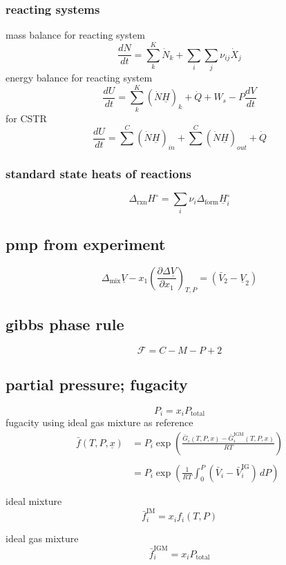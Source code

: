 \documentclass{article}
\begin{document}
\begin{minipage}[t]{0.5\textwidth}
    \subsubsection*{reacting systems}
    mass balance for reacting system
    \[\frac{dN}{dt} = \sum_{k}^K \dot{N}_{k} + \sum_{i} \sum_{j} \nu_{ij} \dot{X}_{j}\]
    energy balance for reacting system
    \[\frac{dU}{dt} = \sum_{k}^K(\dot{N}\underline{H})_{k} + \dot{Q} + W_{s} -P \frac{dV}{dt}\]
    for CSTR
    \[\frac{dU}{dt} = \sum^{C} (\dot{N}\underline{H})_{in} + \sum^{C} (\dot{N}\underline{H})_{out} + \dot{Q} \]
    \subsubsection*{standard state heats of reactions}
    \[\Delta_{\text{rxn}} H^{\circ} = \sum_{i} \nu_{i}\Delta_{\text{form}} \underline{H}_{i}^{\circ}\]
    \subsection*{pmp from experiment}
    \[\Delta_{\text{mix}} \underline{V} - x_{1} \left(\frac{ \partial \Delta \underline{V} }{ \partial x_{1} } \right)_{T,P} = (\bar{V}_{2} - \underline{V}_{2})\]
    \subsection*{gibbs phase rule}
    \[\mathcal{F} = C - M - P + 2\]
    \subsection*{partial pressure; fugacity}
    \[P_{i} = x_{i}P_{\text{total}}\]
    fugacity using ideal gas mixture as reference
    \begin{align*}
        \bar{f}(T,P,\underline{x}) &= P_i \exp \left( \frac{\bar{G}_{i} (T,P,\underline{x}) - \bar{G}_{i}^{\text{IGM}}(T,P,\underline{x})}{RT} \right)  \\ \\
        &= P_i \exp \left( \frac{1}{RT} \int_{0}^P (\bar{V}_{i}- \bar{V}_{i}^{\text{IG}})\,dP \right)
    \end{align*} 
    \begin{minipage}[t]{0.47\textwidth}
        ideal mixture
        \[\bar{f}_{i}^{\text{IM}} = x_{i}f_{i}(T,P)\]
    \end{minipage}
    \begin{minipage}[t]{0.47\textwidth}
        ideal gas mixture
        \[ \bar{f}_{i}^{\text{IGM}} = x_{i} P_{\text{total}} \]
    \end{minipage}
    

\end{minipage}
\end{document}
